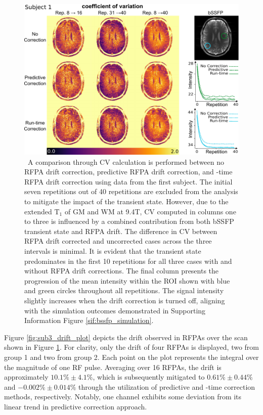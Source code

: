 \begin{figure}
    \centering
    \includegraphics[width=\textwidth]{figures/sub3_drift_result.pdf}
    \caption{\ A comparison through CV calculation is performed between no RFPA drift correction, predictive RFPA drift correction, and -time RFPA drift correction using data from the first subject. The initial seven repetitions out of 40 repetitions are excluded from the analysis to mitigate the impact of the transient state. However, due to the extended $\text{T}_1$ of GM and WM at 9.4T, CV computed in columns one to three is influenced by a combined contribution from both bSSFP transient state and RFPA drift. The difference in CV between RFPA drift corrected and uncorrected cases across the three intervals is minimal. It is evident that the transient state predominates in the first 10 repetitions for all three cases with and without RFPA drift corrections. The final column presents the progression of the mean intensity within the ROI shown with blue and green circles throughout all repetitions. The signal intensity slightly increases when the drift correction is turned off, aligning with the simulation outcomes demonstrated in Supporting Information Figure \ref{sif:bssfp_simulation}.}
    \label{fig:sub3_drift_result}
\end{figure}


Figure \ref{fig:sub3_drift_plot} depicts the drift observed in RFPAs over the scan shown in Figure \ref{fig:sub3_drift_result}. For clarity, only the drift of four RFPAs is displayed, two from group 1 and two from group 2. Each point on the plot represents the integral over the magnitude of one RF pulse. Averaging over 16 RFPAs, the drift is approximately $10.1\%\pm4.1\%$, which is subsequently mitigated to $0.61\%\pm0.44\%$ and $-0.002\%\pm0.014\%$ through the utilization of predictive and -time correction methods, respectively. Notably, one channel exhibits some deviation from its linear trend in predictive correction approach.

